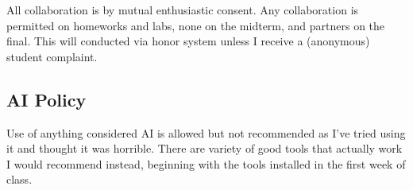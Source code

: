 \documentclass[11pt]{article}
\begin{document}
All collaboration is by mutual enthusiastic consent. Any collaboration is permitted on homeworks and labs, none on the midterm, and partners on the final. This will conducted via honor system unless I receive a (anonymous) student complaint.

\subsection*{AI Policy}

Use of anything considered AI is allowed but not recommended as I've tried using it and thought it was horrible. There are variety of good tools that actually work I would recommend instead, beginning with the tools installed in the first week of class.


\end{document}
